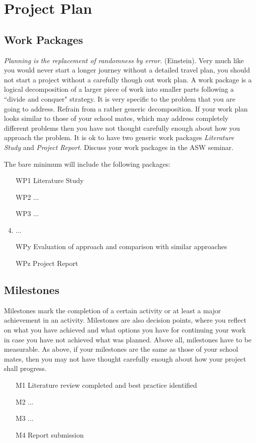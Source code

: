 \documentclass[thesis]{mas_proposal}
\begin{document}
\section{Project Plan}

\subsection{Work Packages}
\emph{Planning is the replacement of randomness by error.} (Einstein). Very much like you would never start a longer journey without a detailed travel plan, you should not start a project without a carefully though out work plan. A work package is a logical decomposition of a larger piece of work into smaller parts following a ``divide and conquer" strategy. It is very specific to the problem that you are going to address. Refrain from a rather generic decomposition. If your work plan looks similar to those of your school mates, which may address completely different problems then you have not thought carefully enough about how you approach the problem. It is ok to have two generic work packages \emph{Literature Study} and \emph{Project Report}. Discuss your work packages in the ASW seminar.

The bare minimum will include the following packages:
\begin{enumerate}
    \item[WP1] Literature Study
    \item[WP2] ...
    \item[WP3] ...
    \item  ...
    \item[WPy] Evaluation of approach and comparison with similar approaches
    \item[WPz] Project Report
\end{enumerate}

\subsection{Milestones}
Milestones mark the completion of a certain activity or at least a major achievement in an activity. Milestones are also decision points, where you reflect on what you have achieved and what options you have for continuing your work in case you have not achieved what was planned. Above all, milestones have to be measurable. As above, if your milestones are the same as those of your school mates, then you may not have thought carefully enough about how your project shall progress.
\begin{enumerate}
    \item[M1] Literature review completed and best practice identified
    \item[M2] ...
    \item[M3] ...
    \item[M4] Report submission
\end{enumerate}
\end{document}
